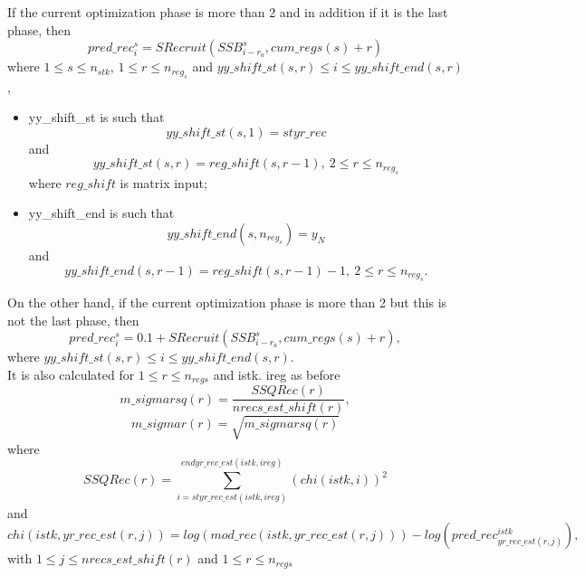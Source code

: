 \documentclass{article}
\begin{document}
If the current optimization phase is more than 2 and in addition if it is the last phase, then
\begin{equation}
    pred\_rec_{i}^s=SRecruit(SSB^s_{i-r_a},cum\_regs(s)+r)
\end{equation}
where $1\leq s \leq n_{stk}$, $1\leq r \leq n_{reg_s}$ and $yy\_shift\_st(s,r)\leq i \leq yy\_shift\_end(s,r)$,\\
\begin{itemize}
    \item yy\_shift\_st is such that $$yy\_shift\_st(s,1)=styr\_rec$$
    and
    \begin{equation*}
         yy\_shift\_st(s,r) = reg\_shift(s,r-1), \ 2\leq r \leq n_{reg_s}
    \end{equation*}
    where $reg\_shift$ is matrix input; 
    \item yy\_shift\_end is such that
    \begin{equation*}
        yy\_shift\_end(s,n_{reg_s})= y_N
    \end{equation*}
    and
    \begin{equation*}
        yy\_shift\_end(s,r-1)=reg\_shift(s,r-1)-1, \ 2 \leq r \leq n_{reg_s}.
    \end{equation*}
\end{itemize}

On the other hand, if the current optimization phase is more than 2 but this is not the last phase, then
\begin{equation}
    pred\_rec^s_i = 0.1+SRecruit(SSB^s_{i-r_a},cum\_regs(s)+r),
\end{equation}
where $yy\_shift\_st(s,r)\leq i \leq yy\_shift\_end(s,r)$.\\

It is also calculated for $1\leq r \leq n_{regs}$ and istk. ireg as before
\begin{equation}
    m\_sigmarsq(r)=\dfrac{SSQRec(r)}{nrecs\_est\_shift(r)},
\end{equation}
\begin{equation}
    m\_sigmar(r)=\sqrt{m\_sigmarsq(r)}
\end{equation}
where 
\begin{equation}
    SSQRec(r)=\displaystyle\sum_{i=styr\_rec\_est(istk,ireg)}^{endyr\_rec\_est(istk,ireg)}(chi(istk,i))^2
\end{equation}
and
\begin{equation}
    chi(istk,yr\_rec\_est(r,j)) = log(mod\_rec(istk,yr\_rec\_est(r,j))) - log(pred\_rec^{istk}_{yr\_rec\_est(r,j)}),
\end{equation}
with $1\leq j \leq nrecs\_est\_shift(r)$ and $1\leq r \leq n_{regs}$
\end{document}
